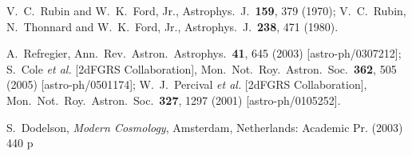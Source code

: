 \documentclass[12pt]{article}
\begin{document}
{{\begin{thebibliography}{999}
  V.~C.~Rubin and W.~K.~Ford, Jr.,
  Astrophys.\ J.\  {\bf 159}, 379 (1970);
  V.~C.~Rubin, N.~Thonnard and W.~K.~Ford, Jr.,
Astrophys.\ J.\  {\bf 238}, 471 (1980).
  
  A.~Refregier,
  Ann.\ Rev.\ Astron.\ Astrophys.\  {\bf 41}, 645 (2003)
  [astro-ph/0307212];
  S.~Cole {\it et al.}  [2dFGRS Collaboration],
  Mon.\ Not.\ Roy.\ Astron.\ Soc.\  {\bf 362}, 505 (2005) [astro-ph/0501174];
W.~J.~Percival {\it et al.}  [2dFGRS Collaboration],
 Mon.\ Not.\ Roy.\ Astron.\ Soc.\  {\bf 327}, 1297 (2001) [astro-ph/0105252].



  S.~Dodelson,
  {\it Modern Cosmology},
  Amsterdam, Netherlands: Academic Pr. (2003) 440 p

  


\end{thebibliography}}}
\end{document}
